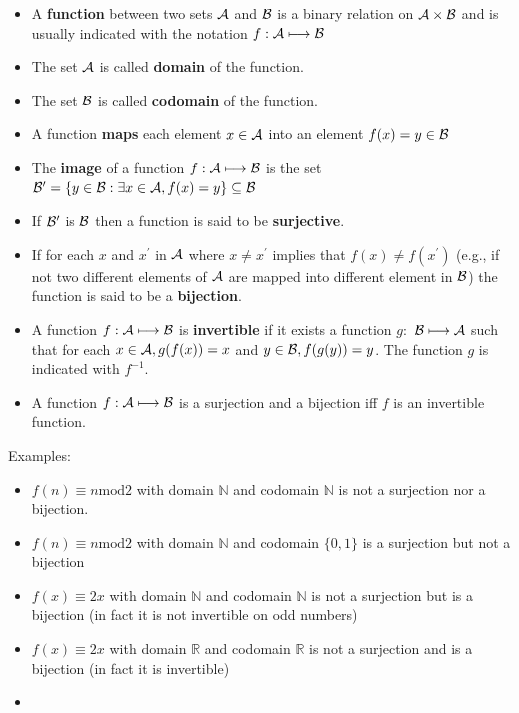 \documentclass[justified, sixbynine]{tufte-book}
\def\func{\textrm}
\theoremstyle{plain}%
\newtheorem * {corollary}{Corollary}
\theoremstyle{definition}
\theoremstyle{remark}
\newtheorem * {remark}{Remark}
\newtheorem * {note}{Note}
\begin{document}
\begin{fullwidth}
\begin{itemize}
\item  A {\bf function} between two sets ${\cal A}$ and ${\cal B}$ is a
binary relation on ${\cal A}\times {\cal B}$ and is usually indicated with
the notation $f:{\cal A}\longmapsto {\cal B}$

\item  The set ${\cal A}$ is called {\bf domain} of the function.

\item  The set ${\cal B}$ is called {\bf codomain} of the function.

\item  A function {\bf maps} each element $x\in {\cal A}$ into an element $%
f(x)=y\in {\cal B}$

\item  The {\bf image} of a function $f:{\cal A}\longmapsto {\cal B}$ is the
set ${\cal B}^{\prime }=\{y\in {\cal B}:\exists x\in {\cal A}%
, f(x)=y\}\subseteq {\cal B}$

\item  If ${\cal B}^{\prime }$ is ${\cal B}$ then a function is said to be
{\bf surjective}.

\item  If for each $x$ and $x^{\prime }$ in ${\cal A}$ where $x\neq
x^{\prime }$ implies that $f(x)\neq f(x^{\prime })$ (e.g., if not two
different elements of ${\cal A}$ are mapped into different element in ${\cal B%
}$) the function is said to be a {\bf bijection}.

\item  A function $f:{\cal A}\longmapsto {\cal B}$ is {\bf invertible} if it
exists a function $g:$ ${\cal B}\longmapsto {\cal A}$ such that for each $%
x\in {\cal A}, g(f(x))=x$ and $y\in {\cal B}, f(g(y))=y$. The function $g$ is
indicated with $f^{-1}$.

\item  A function $f:{\cal A}\longmapsto {\cal B}$ is a surjection and a
bijection iff $f$ is an invertible function.
\end{itemize}

Examples:

\begin{itemize}
\item
$f(n)\equiv n\func{mod}2$ with domain $\mathbb{N}$ and codomain $%
\mathbb{N}$ is not a surjection nor a bijection.
\item
$f(n)\equiv n\func{mod}2$ with domain $\mathbb{N}$ and codomain $%
\{0, 1\}$ is a surjection but not a bijection
\item
$f(x)\equiv 2x$ with domain $\mathbb{N}$ and codomain $\mathbb{N}$ is
not a surjection but is a bijection (in fact it is not invertible on odd
numbers)
\item
$f(x)\equiv 2x$ with domain $\mathbb{R}$ and codomain $\mathbb{R}$ is
not a surjection and is a bijection (in fact it is invertible)
\item
\end{itemize}


\end{fullwidth}
\end{document}
